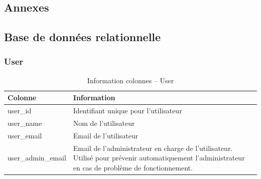 \documentclass[a4paper,10pt, twoside]{report}
\begin{document}
\begin{spacing}{1.2}
\newpage
\listoffigures
\listoftables



\appendix
\makeatletter
\def\@seccntformat#1{Annexe~\csname the#1\endcsname:\quad}
\makeatother
\part{Annexes}
\chapter{Base de données relationnelle}
\thispagestyle{fancy}
\label{annBDR}
\thispagestyle{fancy}
\section{User}
\begin{table}[h!]
  \centering
  \def\arraystretch{1.5}
  \setlength{\fboxsep}{13pt} %
  \setlength{\fboxrule}{0pt} %
  \begin{tabular}{lm{6cm}m{6cm}}
   \rowcolor{arkred} 
    \arrayrulecolor{gray73}\hline
    \color{white} \textbf{Colonne} & \color{white} \textbf{Information}\\
    \hline
    user\_id & Identifiant unique pour l'utilisateur\\
    \hline
    user\_name & Nom de l'utilisateur\\
    \hline
    user\_email & Email de l'utilisateur\\
    \hline
    user\_admin\_email & Email de l'administrateur en charge de l'utilisateur.
    Utilisé pour prévenir automatiquement l'administrateur en cas de
    problème de fonctionnement.
  \end{tabular}
  \caption{\label{tabDBRUser} Information colonnes -- User}
\end{table}


\end{spacing}
\end{document}
